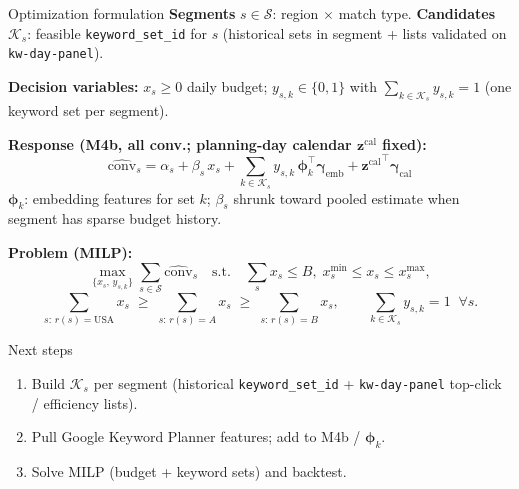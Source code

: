 \documentclass[11pt]{beamer}
\begin{document}
\begin{frame}{Optimization formulation}
  \small
  \textbf{Segments} $s \in \mathcal{S}$: region $\times$ match type.
  \textbf{Candidates} $\mathcal{K}_s$: feasible \texttt{keyword\_set\_id} for $s$
  (historical sets in segment + lists validated on \texttt{kw-day-panel}).

  \textbf{Decision variables:}
  $x_s \geq 0$ daily budget;\;
  $y_{s,k} \in \{0,1\}$ with $\sum_{k \in \mathcal{K}_s} y_{s,k} = 1$ (one keyword set per segment).

  \textbf{Response (M4b, all conv.; planning-day calendar $\mathbf{z}^{\mathrm{cal}}$ fixed):}
  \[
    \widehat{\mathrm{conv}}_{s}
      = \alpha_s + \beta_s\, x_s
      + \sum_{k \in \mathcal{K}_s} y_{s,k}\,\boldsymbol{\phi}_k^\top \boldsymbol{\gamma}_{\mathrm{emb}}
      + {\mathbf{z}^{\mathrm{cal}}}^{\!\top} \boldsymbol{\gamma}_{\mathrm{cal}}
  \]
  $\boldsymbol{\phi}_k$: embedding features for set $k$;
  $\beta_s$ shrunk toward pooled estimate when segment has sparse budget history.

  \textbf{Problem (MILP):}
  \[
    \max_{\{x_s,\,y_{s,k}\}} \sum_{s \in \mathcal{S}} \widehat{\mathrm{conv}}_{s}
    \quad \text{s.t.}\quad
    \sum_{s} x_s \leq B,\;
    x^{\min}_s \leq x_s \leq x^{\max}_s,
  \]
  \[
    \sum_{s:\, r(s)=\mathrm{USA}} \!\!x_s
    \;\geq\;
    \sum_{s:\, r(s)=A} \!\!x_s
    \;\geq\;
    \sum_{s:\, r(s)=B} \!\!x_s,
    \qquad
    \sum_{k \in \mathcal{K}_s} y_{s,k} = 1 \;\;\forall s.
  \]
  \normalsize
\end{frame}

\begin{frame}{Next steps}
  \begin{enumerate}
    \item Build $\mathcal{K}_s$ per segment (historical \texttt{keyword\_set\_id} + \texttt{kw-day-panel} top-click / efficiency lists).
    \item Pull Google Keyword Planner features; add to M4b / $\boldsymbol{\phi}_k$.
    \item Solve MILP (budget + keyword sets) and backtest.
  \end{enumerate}
\end{frame}
\end{document}
